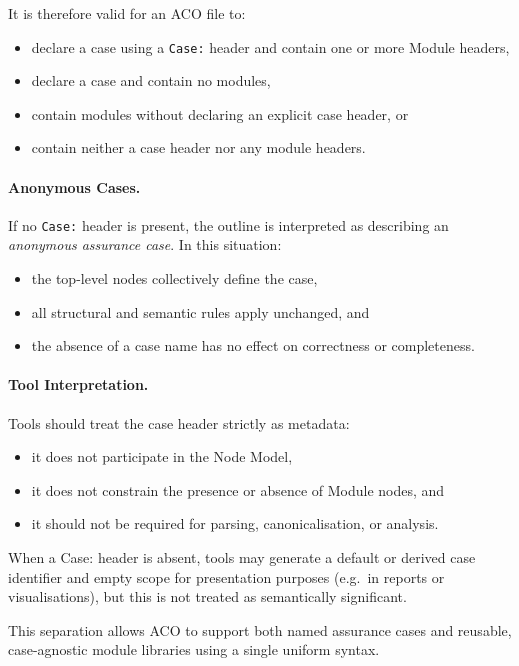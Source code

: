 \documentclass[11pt]{article}
\begin{document}
It is therefore valid for an ACO file to:
\begin{itemize}[leftmargin=2em]
  \item declare a case using a \texttt{Case:} header and contain one or more Module headers,
  \item declare a case and contain no modules,
  \item contain modules without declaring an explicit case header, or
  \item contain neither a case header nor any module headers.
\end{itemize}

\paragraph{Anonymous Cases.}
If no \texttt{Case:} header is present, the outline is interpreted as describing an
\emph{anonymous assurance case}. In this situation:
\begin{itemize}[leftmargin=2em]
  \item the top-level nodes collectively define the case,
  \item all structural and semantic rules apply unchanged, and
  \item the absence of a case name has no effect on correctness or completeness.
\end{itemize}

\paragraph{Tool Interpretation.}
Tools should treat the case header strictly as metadata:
\begin{itemize}[leftmargin=2em]
  \item it does not participate in the Node Model,
  \item it does not constrain the presence or absence of Module nodes, and
  \item it should not be required for parsing, canonicalisation, or analysis.
\end{itemize}

When a Case: header is absent, tools may generate a default or derived case identifier and empty scope
for presentation purposes (e.g.\ in reports or visualisations), but this is not
treated as semantically significant.

This separation allows ACO to support both named assurance cases and reusable,
case-agnostic module libraries using a single uniform syntax.
\\\\\\\\\\
\end{document}
